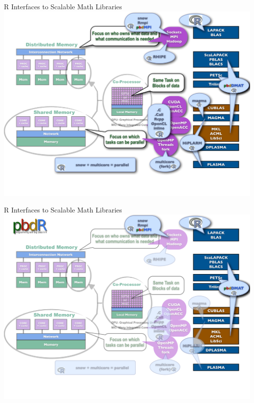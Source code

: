 \begin{frame}
  \begin{block}{\scriptsize R Interfaces to Scalable Math Libraries}
    \includegraphics[width=\textwidth,trim=0ex 20ex 0ex 0ex,clip]{../common/pics/hardware/ParallelHardware12.pdf}
  \end{block}
\end{frame}
 
\begin{frame}
  \begin{block}{\scriptsize R Interfaces to Scalable Math Libraries}
    \includegraphics[width=\textwidth,trim=0ex 20ex 0ex 0ex,clip]{../common/pics/hardware/ParallelHardware13.pdf}
  \end{block}
\end{frame}



